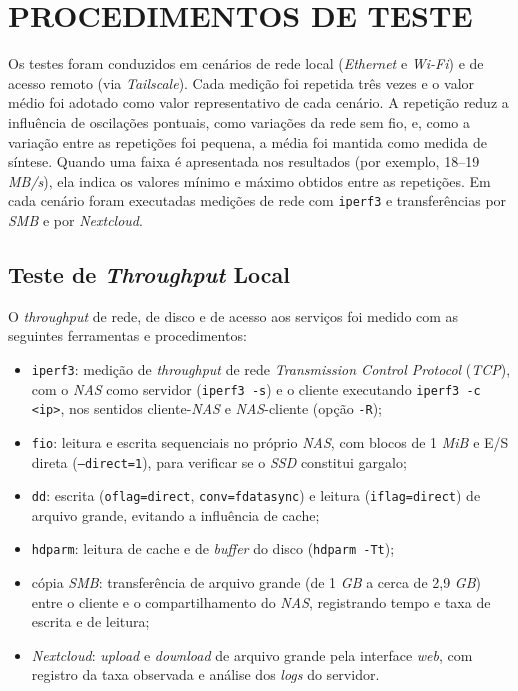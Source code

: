 \section{PROCEDIMENTOS DE TESTE}

Os testes foram conduzidos em cenários de rede local (\textit{Ethernet} e \textit{Wi-Fi}) e de acesso remoto (via \textit{Tailscale}). Cada medição foi repetida três vezes e o valor médio foi adotado como valor representativo de cada cenário. A repetição reduz a influência de oscilações pontuais, como variações da rede sem fio, e, como a variação entre as repetições foi pequena, a média foi mantida como medida de síntese. Quando uma faixa é apresentada nos resultados (por exemplo, 18--19 \textit{MB/s}), ela indica os valores mínimo e máximo obtidos entre as repetições. Em cada cenário foram executadas medições de rede com \texttt{iperf3} e transferências por \textit{SMB} e por \textit{Nextcloud}.

\subsection{Teste de \textit{Throughput} Local}

O \textit{throughput} de rede, de disco e de acesso aos serviços foi medido com as seguintes ferramentas e procedimentos:
\begin{itemize}
    \item \texttt{iperf3}: medição de \textit{throughput} de rede \textit{Transmission Control Protocol} (\textit{TCP}), com o \textit{NAS} como servidor (\texttt{iperf3 -s}) e o cliente executando \texttt{iperf3 -c <ip>}, nos sentidos cliente-\textit{NAS} e \textit{NAS}-cliente (opção \texttt{-R});
    \item \texttt{fio}: leitura e escrita sequenciais no próprio \textit{NAS}, com blocos de 1 \textit{MiB} e E/S direta (\texttt{--direct=1}), para verificar se o \textit{SSD} constitui gargalo;
    \item \texttt{dd}: escrita (\texttt{oflag=direct}, \texttt{conv=fdatasync}) e leitura (\texttt{iflag=direct}) de arquivo grande, evitando a influência de cache;
    \item \texttt{hdparm}: leitura de cache e de \textit{buffer} do disco (\texttt{hdparm -Tt});
    \item cópia \textit{SMB}: transferência de arquivo grande (de 1 \textit{GB} a cerca de 2,9 \textit{GB}) entre o cliente e o compartilhamento do \textit{NAS}, registrando tempo e taxa de escrita e de leitura;
    \item \textit{Nextcloud}: \textit{upload} e \textit{download} de arquivo grande pela interface \textit{web}, com registro da taxa observada e análise dos \textit{logs} do servidor.
\end{itemize}

